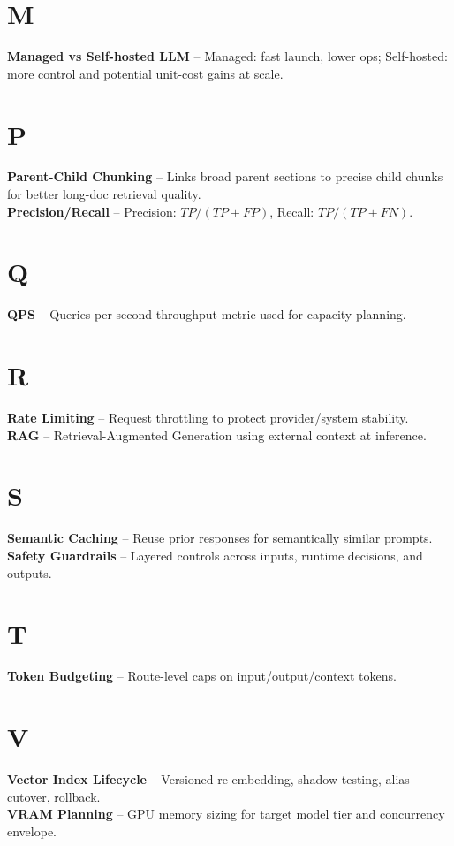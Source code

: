 \section*{M}
\textbf{Managed vs Self-hosted LLM} -- Managed: fast launch, lower ops; Self-hosted: more control and potential unit-cost gains at scale.

\section*{P}
\textbf{Parent-Child Chunking} -- Links broad parent sections to precise child chunks for better long-doc retrieval quality.\\
\textbf{Precision/Recall} -- Precision: $TP/(TP+FP)$, Recall: $TP/(TP+FN)$.

\section*{Q}
\textbf{QPS} -- Queries per second throughput metric used for capacity planning.

\section*{R}
\textbf{Rate Limiting} -- Request throttling to protect provider/system stability.\\
\textbf{RAG} -- Retrieval-Augmented Generation using external context at inference.

\section*{S}
\textbf{Semantic Caching} -- Reuse prior responses for semantically similar prompts.\\
\textbf{Safety Guardrails} -- Layered controls across inputs, runtime decisions, and outputs.

\section*{T}
\textbf{Token Budgeting} -- Route-level caps on input/output/context tokens.

\section*{V}
\textbf{Vector Index Lifecycle} -- Versioned re-embedding, shadow testing, alias cutover, rollback.\\
\textbf{VRAM Planning} -- GPU memory sizing for target model tier and concurrency envelope.

